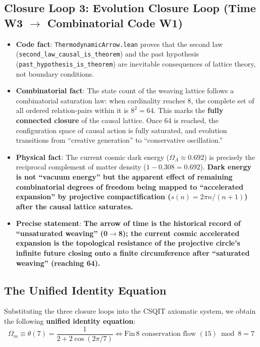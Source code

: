\documentclass[aps,prd,twocolumn,nofootinbib,floatfix]{revtex4-2}
\begin{document}
\subsection{Closure Loop 3: Evolution Closure Loop (Time W3 $\to$ Combinatorial Code W1)}

\begin{itemize}
    \item \textbf{Code fact}: \texttt{ThermodynamicArrow.lean} proves that the second law (\texttt{second\_law\_causal\_is\_theorem}) and the past hypothesis (\texttt{past\_hypothesis\_is\_theorem}) are inevitable consequences of lattice theory, not boundary conditions.
    \item \textbf{Combinatorial fact}: The state count of the weaving lattice follows a combinatorial saturation law: when cardinality reaches 8, the complete set of all ordered relation-pairs within it is $8^2 = 64$. This marks the \textbf{fully connected closure} of the causal lattice. Once 64 is reached, the configuration space of causal action is fully saturated, and evolution transitions from ``creative generation'' to ``conservative oscillation.''
    \item \textbf{Physical fact}: The current cosmic dark energy ($\Omega_\Lambda \approx 0.692$) is precisely the reciprocal complement of matter density ($1 - 0.308 = 0.692$). \textbf{Dark energy is not ``vacuum energy'' but the apparent effect of remaining combinatorial degrees of freedom being mapped to ``accelerated expansion'' by projective compactification ($s(n) = 2\pi n/(n+1)$) after the causal lattice saturates.}
    \item \textbf{Precise statement}: \textbf{The arrow of time is the historical record of ``unsaturated weaving'' (0$\to$8); the current cosmic accelerated expansion is the topological resistance of the projective circle's infinite future closing onto a finite circumference after ``saturated weaving'' (reaching 64).}
\end{itemize}

\subsection{The Unified Identity Equation}

Substituting the three closure loops into the CSQIT axiomatic system, we obtain the following \textbf{unified identity equation}:
\[
\boxed{\Omega_m \equiv \theta(7) = \frac{1}{2+2\cos(2\pi/7)} \iff \text{Fin}\,8 \text{ conservation flow } (15) \bmod 8 = 7}
\]
\end{document}
